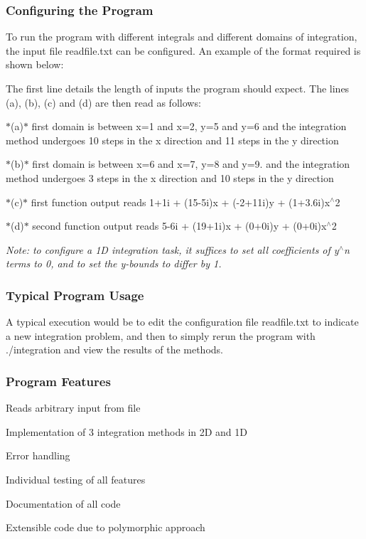 \subsubsection*{Configuring the Program}

To run the program with different integrals and different domains of integration, the input file {\ttfamily readfile.\+txt} can be configured. An example of the format required is shown below\+:



The first line details the length of inputs the program should expect. The lines (a), (b), (c) and (d) are then read as follows\+:
\begin{DoxyItemize}
\item $\ast$(a)$\ast$ first domain is between x=1 and x=2, y=5 and y=6 and the integration method undergoes 10 steps in the x direction and 11 steps in the y direction
\item $\ast$(b)$\ast$ first domain is between x=6 and x=7, y=8 and y=9. and the integration method undergoes 3 steps in the x direction and 10 steps in the y direction
\item $\ast$(c)$\ast$ first function output reads 1+1i + (15-\/5i)x + (-\/2+11i)y + (1+3.6i)x$^\wedge$2
\item $\ast$(d)$\ast$ second function output reads 5-\/6i + (19+1i)x + (0+0i)y + (0+0i)x$^\wedge$2
\end{DoxyItemize}

{\itshape Note\+: to configure a 1D integration task, it suffices to set all coefficients of y$^\wedge$n terms to 0, and to set the y-\/bounds to differ by 1.}

\subsubsection*{Typical Program Usage}

A typical execution would be to edit the configuration file {\ttfamily readfile.\+txt} to indicate a new integration problem, and then to simply rerun the program with {\ttfamily ./integration} and view the results of the methods.

\subsubsection*{Program Features}


\begin{DoxyItemize}
\item Reads arbitrary input from file
\item Implementation of 3 integration methods in 2D and 1D
\item Error handling
\item Individual testing of all features
\item Documentation of all code
\item Extensible code due to polymorphic approach
\end{DoxyItemize}


